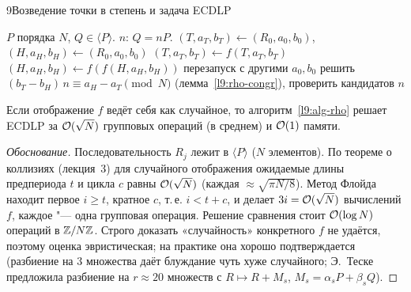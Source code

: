 \begin{lecture}{9}{Возведение точки в степень и задача ECDLP}
\begin{algorithm}\label{l9:alg-rho}\leavevmode
\begin{algorithmic}[1]
\Require $P$ порядка $N$, $Q \in \langle P \rangle$.
\Ensure $n$: $Q = nP$.
\State $(T, a_T, b_T) \gets (R_0, a_0, b_0)$, \quad $(H, a_H, b_H) \gets (R_0, a_0, b_0)$
\Repeat
  \State $(T, a_T, b_T) \gets f(T, a_T, b_T)$ 
  \State $(H, a_H, b_H) \gets f(f(H, a_H, b_H))$ 
 \State перезапуск с другими $a_0, b_0$ \EndIf
\State решить $(b_T - b_H)\, n \equiv a_H - a_T \pmod N$ (лемма~\ref{l9:rho-congr}), проверить
  кандидатов
\State \Return $n$
\end{algorithmic}
\end{algorithm}

\begin{theorem}\label{l9:rho-cost}
Если отображение $f$ ведёт себя как случайное, то алгоритм~\ref{l9:alg-rho} решает ECDLP за
$\mathcal{O}(\sqrt N)$ групповых операций (в среднем) и $\mathcal{O}(1)$ памяти.
\end{theorem}

\begin{proof}[Обоснование]
Последовательность $R_j$ лежит в $\langle P \rangle$ ($N$ элементов). По теореме о коллизиях
(лекция~3) для случайного отображения ожидаемые длины предпериода $t$ и цикла $c$ равны
$\mathcal{O}(\sqrt N)$ (каждая $\approx \sqrt{\pi N / 8}$). Метод Флойда находит первое $i \ge t$,
кратное $c$, т.\,е. $i < t + c$, и делает $3i = \mathcal{O}(\sqrt N)$ вычислений $f$, каждое "---
одна групповая операция. Решение сравнения стоит $\mathcal{O}(\log N)$ операций в $\mathbb{Z}/N\mathbb{Z}$.
Строго доказать «случайность» конкретного $f$ не удаётся, поэтому оценка эвристическая; на
практике она хорошо подтверждается (разбиение на $3$ множества даёт блуждание чуть хуже
случайного; Э.~Теске предложила разбиение на $r \approx 20$ множеств с $R \mapsto R + M_s$,
$M_s = \alpha_s P + \beta_s Q$).
\end{proof}


\end{lecture}
